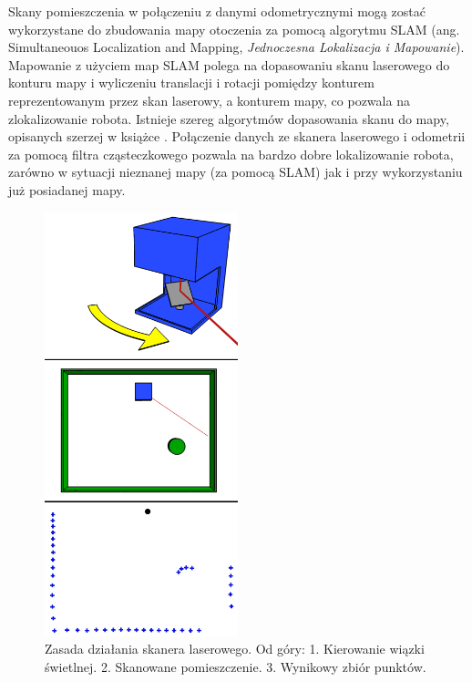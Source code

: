 Skany pomieszczenia w połączeniu z danymi odometrycznymi mogą zostać wykorzystane do zbudowania mapy otoczenia za pomocą algorytmu SLAM (ang. Simultaneouos Localization and Mapping, \textit{Jednoczesna Lokalizacja i Mapowanie}). Mapowanie z użyciem map SLAM polega na dopasowaniu skanu laserowego do konturu mapy i wyliczeniu translacji i rotacji pomiędzy konturem reprezentowanym przez skan laserowy, a konturem mapy, co pozwala na zlokalizowanie robota. Istnieje szereg algorytmów dopasowania skanu do mapy, opisanych szerzej w książce \cite{probabilistic_robotics}. Połączenie danych ze skanera laserowego i odometrii za pomocą filtra cząsteczkowego pozwala na bardzo dobre lokalizowanie robota, zarówno w sytuacji nieznanej mapy (za pomocą SLAM) jak i przy wykorzystaniu już posiadanej mapy.
\begin{figure}[]
\centering
\includegraphics[width=0.5\textwidth]{img/lidar.png}
\caption{Zasada działania skanera laserowego. Od góry: 1. Kierowanie wiązki świetlnej. 2. Skanowane pomieszczenie. 3. Wynikowy zbiór punktów.}
\label{fig:lidar}
\end{figure}

